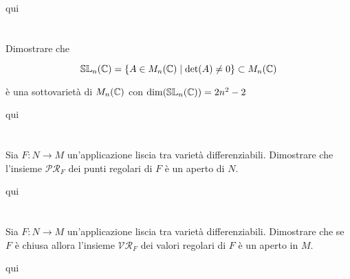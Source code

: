 qui

%

\newpage

%

\section{}\label{es2-16}

\begin{tcolorbox}
	Dimostrare che
	
	\begin{equation}
		\mathbb{SL}_{n}(\mathbb{C}) = \{ A \in M_{n}(\mathbb{C}) \mid \det(A) \neq 0 \} \subset M_{n}(\mathbb{C})
	\end{equation}
	
	è una sottovarietà di $ M_{n}(\mathbb{C}) $ con $ \dim(\mathbb{SL}_{n}(\mathbb{C})) = 2n^{2}-2  $
\end{tcolorbox}

qui

%

\newpage

%

\section{}\label{es2-17}

\begin{tcolorbox}
	Sia $ F : N \to M $ un'applicazione liscia tra varietà differenziabili. Dimostrare che l'insieme $ \mathcal{PR}_{F} $ dei punti regolari di $ F $ è un aperto di $ N $.
\end{tcolorbox}

qui

%

\newpage

%

\section{}\label{es2-18}

\begin{tcolorbox}
	Sia $ F : N \to M $ un'applicazione liscia tra varietà differenziabili. Dimostrare che se $ F $ è chiusa allora  l'insieme $ \mathcal{VR}_{F} $ dei valori regolari di $ F $ è un aperto in $ M $.
\end{tcolorbox}

qui

%

\newpage

%

